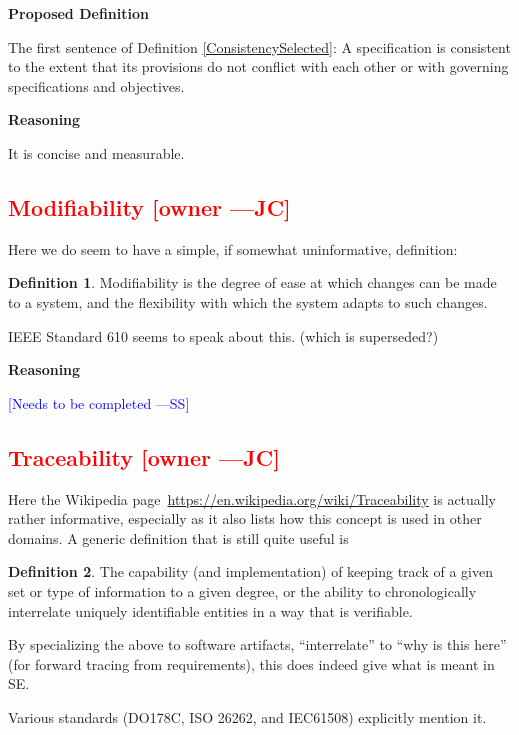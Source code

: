 \documentclass[letterpaper,cleveref]{lipics-v2019}
\newcommand{\authornote}[3]{\textcolor{#1}{[#3 ---#2]}}
\newcommand{\authornote}[3]{}
\newcommand{\wss}[1]{\authornote{blue}{SS}{#1}} %
\newcommand{\jc}[1]{\authornote{red}{JC}{#1}} %
\newcommand{\notdone}[1]{\textcolor{red}{#1}}
\theoremstyle{definition}
\newtheorem{defn}{Definition}
\begin{document}
\noindent \textbf{Proposed Definition} 

The first sentence of Definition \ref{ConsistencySelected}: A specification is
consistent to the extent that its provisions do not conflict with each other or
with governing specifications and objectives.

\noindent \textbf{Reasoning}

It is concise and measurable.

\subsection{\notdone{Modifiability} \jc{owner}}

Here we do seem to have a simple, if somewhat uninformative, definition:

\begin{defn}
  Modifiability is the degree of ease at which changes can be made to a system,
  and the flexibility with which the system adapts to such changes.
\end{defn}

IEEE Standard 610 seems to speak about this. (which is superseded?)

\noindent \textbf{Reasoning}

\wss{Needs to be completed}

\subsection{\notdone{Traceability} \jc{owner}}

Here the Wikipedia page~\url{https://en.wikipedia.org/wiki/Traceability} is
actually rather informative, especially as it also lists how this concept is
used in other domains.  A generic definition that is still quite useful is
\begin{defn}
  The capability (and implementation) of keeping track of a given set or type of
  information to a given degree, or the ability to chronologically interrelate
  uniquely identifiable entities in a way that is verifiable.
\end{defn}
By specializing the above to software artifacts, ``interrelate'' to ``why is
this here'' (for forward tracing from requirements), this does indeed give what
is meant in SE.

Various standards (DO178C, ISO 26262, and IEC61508) explicitly mention it.
\end{document}

